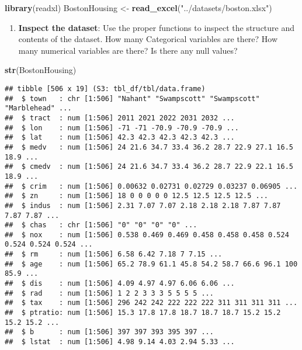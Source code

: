 \documentclass[
]{book}
\newenvironment{Shaded}{\begin{snugshade}}{\end{snugshade}}
\newcommand{\FunctionTok}[1]{\textcolor[rgb]{0.13,0.29,0.53}{\textbf{#1}}}
\newcommand{\NormalTok}[1]{#1}
\newcommand{\OtherTok}[1]{\textcolor[rgb]{0.56,0.35,0.01}{#1}}
\newcommand{\StringTok}[1]{\textcolor[rgb]{0.31,0.60,0.02}{#1}}
\providecommand{\tightlist}{%
  \setlength{\itemsep}{0pt}\setlength{\parskip}{0pt}}
\begin{document}
\begin{Shaded}
\begin{Highlighting}[]
\FunctionTok{library}\NormalTok{(readxl)}
\NormalTok{BostonHousing }\OtherTok{\textless{}{-}} \FunctionTok{read\_excel}\NormalTok{(}\StringTok{"../datasets/boston.xlsx"}\NormalTok{)}
\end{Highlighting}
\end{Shaded}

\begin{enumerate}
\def\labelenumi{\arabic{enumi}.}
\setcounter{enumi}{1}
\tightlist
\item
  \textbf{Inspect the dataset}: Use the proper functions to inspect the structure and contents of the dataset. How many Categorical variables are there? How many numerical variables are there? Is there any null values?
\end{enumerate}

\begin{Shaded}
\begin{Highlighting}[]
\FunctionTok{str}\NormalTok{(BostonHousing)}
\end{Highlighting}
\end{Shaded}

\begin{verbatim}
## tibble [506 x 19] (S3: tbl_df/tbl/data.frame)
##  $ town   : chr [1:506] "Nahant" "Swampscott" "Swampscott" "Marblehead" ...
##  $ tract  : num [1:506] 2011 2021 2022 2031 2032 ...
##  $ lon    : num [1:506] -71 -71 -70.9 -70.9 -70.9 ...
##  $ lat    : num [1:506] 42.3 42.3 42.3 42.3 42.3 ...
##  $ medv   : num [1:506] 24 21.6 34.7 33.4 36.2 28.7 22.9 27.1 16.5 18.9 ...
##  $ cmedv  : num [1:506] 24 21.6 34.7 33.4 36.2 28.7 22.9 22.1 16.5 18.9 ...
##  $ crim   : num [1:506] 0.00632 0.02731 0.02729 0.03237 0.06905 ...
##  $ zn     : num [1:506] 18 0 0 0 0 0 12.5 12.5 12.5 12.5 ...
##  $ indus  : num [1:506] 2.31 7.07 7.07 2.18 2.18 2.18 7.87 7.87 7.87 7.87 ...
##  $ chas   : chr [1:506] "0" "0" "0" "0" ...
##  $ nox    : num [1:506] 0.538 0.469 0.469 0.458 0.458 0.458 0.524 0.524 0.524 0.524 ...
##  $ rm     : num [1:506] 6.58 6.42 7.18 7 7.15 ...
##  $ age    : num [1:506] 65.2 78.9 61.1 45.8 54.2 58.7 66.6 96.1 100 85.9 ...
##  $ dis    : num [1:506] 4.09 4.97 4.97 6.06 6.06 ...
##  $ rad    : num [1:506] 1 2 2 3 3 3 5 5 5 5 ...
##  $ tax    : num [1:506] 296 242 242 222 222 222 311 311 311 311 ...
##  $ ptratio: num [1:506] 15.3 17.8 17.8 18.7 18.7 18.7 15.2 15.2 15.2 15.2 ...
##  $ b      : num [1:506] 397 397 393 395 397 ...
##  $ lstat  : num [1:506] 4.98 9.14 4.03 2.94 5.33 ...
\end{verbatim}
\end{document}
